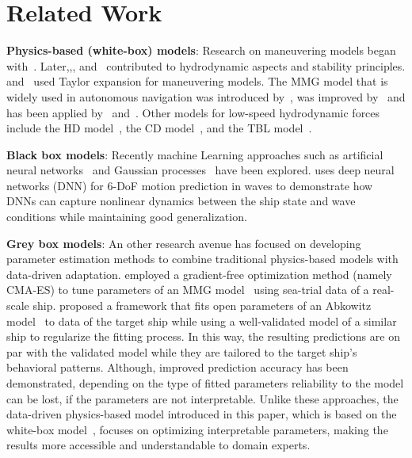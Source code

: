 \section{Related Work}
\label{sec:related_Work}

\textbf{Physics-based (white-box) models}:
Research on maneuvering models began with~\cite{davidson1946turning}. Later,\cite{motora1959measurement},\cite{motora1955course}, and~\cite{nomoto1957steering} contributed to hydrodynamic aspects and stability principles. \cite{abkowitz1964ship} and~\cite{aastrom1976identification} used Taylor expansion for maneuvering models. The MMG model that is widely used in autonomous navigation was introduced by~\cite{ogawa1977mmg}, was improved by~\cite{yasukawa2015introduction} and has been applied by~\cite{li2013active} and~\cite{zhang2017ship}. Other models for low-speed hydrodynamic forces include the HD model~\cite{yasukawa2015introduction}, the CD model~\cite{yoshimura2012hydrodynamic}, and the TBL model~\cite{sutulo2015development}.

\textbf{Black box models}: Recently machine Learning approaches such as   artificial neural networks~\cite{moreira2003dynamic,rajesh2008system,zhang2013black,oskin2013neural,luo2016modeling,woo2018dynamic} and Gaussian processes~\cite{arizaramirez2018nonparametric,xue2020system} have been explored. \cite{SILVA2022103222} uses deep neural networks (DNN) for 6-DoF motion prediction in waves to demonstrate how DNNs can capture nonlinear dynamics between the ship state and wave conditions while maintaining good generalization.

\textbf{Grey box models}:
An other research avenue has focused on developing parameter estimation methods to combine traditional physics-based models with data-driven adaptation.
\cite{suyama2024parameter,MiyauchiCMAES} employed a gradient-free optimization method (namely CMA-ES) to tune parameters of an MMG model~\cite{yasukawa2015introduction} using sea-trial data of a real-scale ship. 
\cite{kanazawa2023bridging} proposed a framework that 
fits open parameters of an Abkowitz model~\cite{abkowitz1964ship} to data of the target ship while using a well-validated model of a similar ship to regularize the fitting process. In this way, the resulting predictions are on par with the validated model while they are tailored to the target ship's behavioral patterns. 
Although, improved prediction accuracy has been demonstrated, depending on the type of fitted parameters reliability to the model can be lost, if the parameters are not interpretable.
Unlike these approaches, the data-driven physics-based model introduced in this paper, which is based on the white-box model~\cite{mathioudakis2025realworldvalidationphysicsbasedship}, focuses on optimizing interpretable parameters, making the results more accessible and understandable to domain experts.   \vspace{-4mm}



